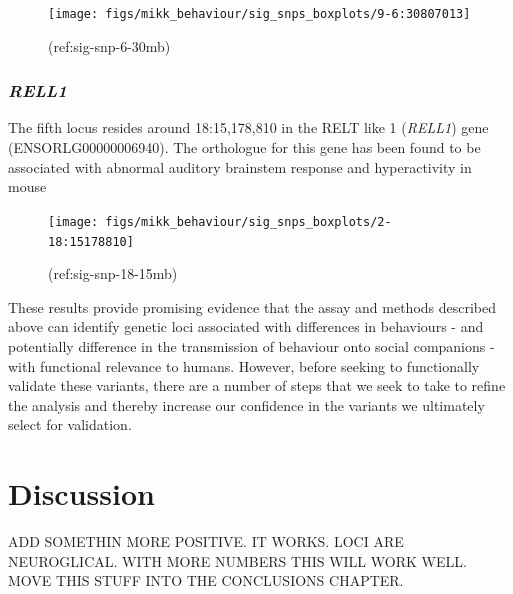 \documentclass[
]{book}
\begin{document}
\begin{figure}
\texttt{[image: figs/mikk\_behaviour/sig\_snps\_boxplots/9-6:30807013]} \caption{(ref:sig-snp-6-30mb)}\label{fig:sig-snp-6-30mb}
\end{figure}

\hypertarget{rell1}{%
\subsubsection{\texorpdfstring{\emph{RELL1}}{RELL1}}\label{rell1}}

The fifth locus resides around 18:15,178,810 in the RELT like 1 (\emph{RELL1}) gene (ENSORLG00000006940). The orthologue for this gene has been found to be associated with abnormal auditory brainstem response and hyperactivity in mouse

\begin{figure}
\texttt{[image: figs/mikk\_behaviour/sig\_snps\_boxplots/2-18:15178810]} \caption{(ref:sig-snp-18-15mb)}\label{fig:sig-snp-18-15mb}
\end{figure}

These results provide promising evidence that the assay and methods described above can identify genetic loci associated with differences in behaviours - and potentially difference in the transmission of behaviour onto social companions - with functional relevance to humans. However, before seeking to functionally validate these variants, there are a number of steps that we seek to take to refine the analysis and thereby increase our confidence in the variants we ultimately select for validation.

\clearpage

\hypertarget{discussion}{%
\section{Discussion}\label{discussion}}

ADD SOMETHIN MORE POSITIVE. IT WORKS. LOCI ARE NEUROGLICAL. WITH MORE NUMBERS THIS WILL WORK WELL. MOVE THIS STUFF INTO THE CONCLUSIONS CHAPTER.
\end{document}
